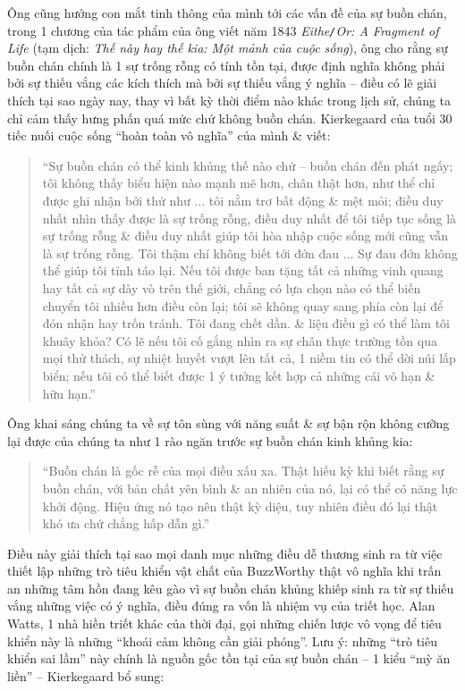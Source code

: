 \documentclass{article}
\begin{document}
\begin{enumerate}
	Ông cũng hướng con mắt tinh thông của mình tới các vấn đề của sự buồn chán, trong 1 chương của tác phẩm của ông viết năm 1843 {\it Eithe{\tt/}Or: A Fragment of Life} (tạm dịch: {\it Thế này hay thế kia: Một mảnh của cuộc sống}), ông cho rằng sự buồn chán chính là 1 sự trống rỗng có tính tồn tại, được định nghĩa không phải bởi sự thiếu vắng các kích thích mà bởi sự thiếu vắng ý nghĩa -- điều có lẽ giải thích tại sao ngày nay, thay vì bất kỳ thời điểm nào khác trong lịch sử, chúng ta chỉ cảm thấy hưng phấn quá mức chứ không buồn chán. {\sc Kierkegaard} của tuổi 30 tiếc nuối cuộc sống ``hoàn toàn vô nghĩa'' của mình \& viết:
	\begin{quote}
		``Sự buồn chán có thể kinh khủng thế nào chứ -- buồn chán đến phát ngấy; tôi không thấy biểu hiện nào mạnh mẽ hơn, chân thật hơn, như thể chỉ được ghi nhận bởi thứ như $\ldots$ tôi nằm trơ bất động \& mệt mỏi; điều duy nhất nhìn thấy được là sự trống rỗng, điều duy nhất để tôi tiếp tục sống là sự trống rỗng \& điều duy nhất giúp tôi hòa nhập cuộc sống mới cũng vẫn là sự trống rỗng. Tôi thậm chí không biết tới đớn đau $\ldots$ Sự đau đớn không thể giúp tôi tỉnh táo lại. Nếu tôi được ban tặng tất cả những vinh quang hay tất cả sự dày vò trên thế giới, chẳng có lựa chọn nào có thể biến chuyển tôi nhiều hơn điều còn lại; tôi sẽ không quay sang phía còn lại để đón nhận hay trốn tránh. Tôi đang chết dần. \& liệu điều gì có thể làm tôi khuây khỏa? Có lẽ nếu tôi cố gắng nhìn ra sự chân thực trường tồn qua mọi thử thách, sự nhiệt huyết vượt lên tất cả, 1 niềm tin có thể dời núi lấp biển; nếu tôi có thể biết được 1 ý tưởng kết hợp cả những cái vô hạn \& hữu hạn.''
	\end{quote}
	Ông khai sáng chúng ta về sự tôn sùng với năng suất \& sự bận rộn không cưỡng lại được của chúng ta như 1 rào ngăn trước sự buồn chán kinh khủng kia:
	\begin{quote}
		``Buồn chán là gốc rễ của mọi điều xấu xa. Thật hiếu kỳ khi biết rằng sự buồn chán, với bản chất yên bình \& an nhiên của nó, lại có thể có năng lực khởi động. Hiệu ứng nó tạo nên thật kỳ diệu, tuy nhiên điều đó lại thật khó ưa chứ chẳng hấp dẫn gì.''
	\end{quote}
	Điều này giải thích tại sao mọi danh mục những điều dễ thương sinh ra từ việc thiết lập những trò tiêu khiển vật chất của BuzzWorthy thật vô nghĩa khi trấn an những tâm hồn đang kêu gào vì sự buồn chán khủng khiếp sinh ra từ sự thiếu vắng những việc có ý nghĩa, điều đúng ra vốn là nhiệm vụ của triết học. {\sc Alan Watts}, 1 nhà hiền triết khác của thời đại, gọi những chiến lược vô vọng để tiêu khiển này là những ``khoái cảm không cần giải phóng''. Lưu ý: những ``trò tiêu khiển sai lầm'' này chính là nguồn gốc tồn tại của sự buồn chán -- 1 kiểu ``mỳ ăn liền'' -- {\sc Kierkegaard} bổ sung:

\end{enumerate}
\end{document}
